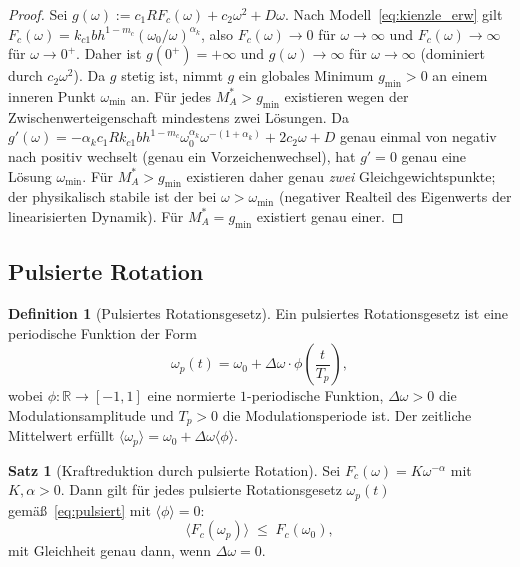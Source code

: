 ﻿\documentclass[a4paper,12pt]{article}
\theoremstyle{definition}
\newtheorem{definition}{Definition}
\newtheorem{satz}{Satz}
\begin{document}
\begin{proof}
Sei $g(\omega) := c_1 R F_c(\omega) + c_2 \omega^2 + D\omega$. Nach Modell~\eqref{eq:kienzle_erw}
gilt $F_c(\omega) = k_{c1} b h^{1-m_c} (\omega_0/\omega)^{\alpha_k}$, also $F_c(\omega) \to 0$
für $\omega \to \infty$ und $F_c(\omega) \to \infty$ für $\omega \to 0^+$. Daher ist
$g(0^+) = +\infty$ und $g(\omega) \to \infty$ für $\omega \to \infty$ (dominiert durch $c_2\omega^2$).
Da $g$ stetig ist, nimmt $g$ ein globales Minimum $g_{\min} > 0$ an einem inneren Punkt $\omega_{\min}$ an.
Für jedes $M_A^* > g_{\min}$ existieren wegen der Zwischenwerteigenschaft mindestens zwei Lösungen.
Da $g'(\omega) = -\alpha_k c_1 R k_{c1} b h^{1-m_c} \omega_0^{\alpha_k} \omega^{-(1+\alpha_k)} + 2c_2\omega + D$
genau einmal von negativ nach positiv wechselt (genau ein Vorzeichenwechsel), hat $g' = 0$ genau
eine Lösung $\omega_{\min}$. Für $M_A^* > g_{\min}$ existieren daher genau \emph{zwei}
Gleichgewichtspunkte; der physikalisch stabile ist der bei $\omega > \omega_{\min}$ (negativer
Realteil des Eigenwerts der linearisierten Dynamik). Für $M_A^* = g_{\min}$ existiert genau einer.
\end{proof}

\subsection{Pulsierte Rotation}

\begin{definition}[Pulsiertes Rotationsgesetz]
Ein pulsiertes Rotationsgesetz ist eine periodische Funktion der Form
\begin{equation}
\label{eq:pulsiert}
\omega_p(t) = \omega_0 + \Delta\omega \cdot \phi\!\left(\frac{t}{T_p}\right),
\end{equation}
wobei $\phi: \mathbb{R} \to [-1,1]$ eine normierte $1$-periodische Funktion,
$\Delta\omega > 0$ die Modulationsamplitude und $T_p > 0$ die Modulationsperiode ist.
Der zeitliche Mittelwert erfüllt $\langle \omega_p \rangle = \omega_0 + \Delta\omega \langle\phi\rangle$.
\end{definition}

\begin{satz}[Kraftreduktion durch pulsierte Rotation]
\label{satz:kraftreduktion}
Sei $F_c(\omega) = K \omega^{-\alpha}$ mit $K, \alpha > 0$. Dann gilt für jedes pulsierte
Rotationsgesetz $\omega_p(t)$ gemäß~\eqref{eq:pulsiert} mit $\langle\phi\rangle = 0$:
\[
\langle F_c(\omega_p) \rangle \;\leq\; F_c(\omega_0),
\]
mit Gleichheit genau dann, wenn $\Delta\omega = 0$.
\end{satz}
\end{document}
